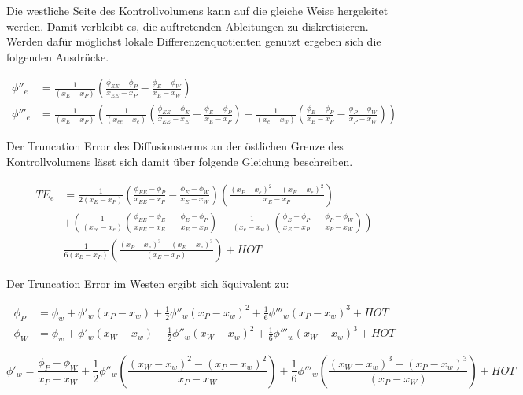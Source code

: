 \documentclass[10pt, ngerman,colorback,accentcolor=tud2d]{tudreport}
\begin{document}
Die westliche Seite des Kontrollvolumens kann auf die gleiche Weise hergeleitet werden.
Damit verbleibt es, die auftretenden Ableitungen zu diskretisieren. Werden dafür
möglichst lokale Differenzenquotienten genutzt ergeben sich die folgenden Ausdrücke.

\begin{align*}
  \phi''_e &= \frac{1}{(x_E-x_P)}\left({
\frac{\phi_{EE}-\phi_P}{x_{EE}-x_P}-\frac{\phi_E-\phi_W}{x_E-x_W}}\right)\\
\phi'''_e &= \frac{1}{(x_E-x_P)}\left({
\frac{1}{(x_{ee}-x_e)}
\left({\frac{\phi_{EE}-\phi_E}{x_{EE}-x_E}-\frac{\phi_E-\phi_P}{x_E-x_P} }\right)
-\frac{1}{(x_e-x_w)}
\left({\frac{\phi_E-\phi_P}{x_E-x_P} - \frac{\phi_P-\phi_W}{x_P-x_W}  }\right)
}\right)
\end{align*}


Der Truncation Error des Diffusionsterms an der östlichen Grenze des Kontrollvolumens
lässt sich damit über folgende Gleichung beschreiben.

\begin{align*}
  {TE}_e &= \frac{1}{2 (x_E-x_P)}\left({
\frac{\phi_{EE}-\phi_P}{x_{EE}-x_P}-\frac{\phi_E-\phi_W}{x_E-x_W}}\right) \left({\frac{{(x_P-x_e)}^2-{(x_E-x_e)}^2}{x_E-x_P}}\right)\\
&+
\left({
\frac{1}{(x_{ee}-x_e)}
\left({\frac{\phi_{EE}-\phi_E}{x_{EE}-x_E}-\frac{\phi_E-\phi_P}{x_E-x_P} }\right)
-\frac{1}{(x_e-x_w)}
\left({\frac{\phi_E-\phi_P}{x_E-x_P} - \frac{\phi_P-\phi_W}{x_P-x_W}  }\right)
}\right)\\
&\frac{1}{6(x_E-x_P)}\left({\frac{{(x_P-x_e)}^3-{(x_E-x_e)}^3}{(x_E-x_P)}}\right)
+HOT
\end{align*}

Der Truncation Error im Westen ergibt sich äquivalent zu:

\begin{align*}
  \phi_P &= \phi_w + \phi'_w(x_P-x_w)+\frac{1}{2}\phi''_w(x_P-x_w)^2
  +\frac{1}{6}\phi'''_w(x_P-x_w)^3+HOT\\
  \phi_W &= \phi_w + \phi'_w(x_W-x_w)+\frac{1}{2}\phi''_w(x_W-x_w)^2
  +\frac{1}{6}\phi'''_w(x_W-x_w)^3+HOT
\end{align*}

\begin{equation}
  \phi'_w = \frac{\phi_P-\phi_W}{x_P-x_W}+\frac{1}{2}\phi''_w
\left({\frac{{(x_W-x_w)}^2-{(x_P-x_w)}^2}{x_P-x_W}}\right)+
\frac{1}{6} \phi'''_w \left({\frac{{(x_W-x_w)}^3-{(x_P-x_w)}^3}{(x_P-x_W)}}\right)+HOT
\end{equation}
\end{document}
